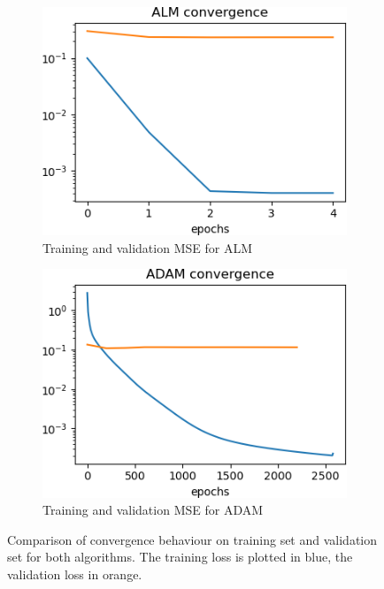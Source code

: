\begin{figure}[p]
     \centering
     \begin{subfigure}[b]{0.49\textwidth}
         \centering
         \includegraphics[width=\textwidth]{almlaserconv}
         \caption{Training and validation MSE for ALM}
         \label{almlaserconv}
     \end{subfigure}
     \begin{subfigure}[b]{0.49\textwidth}
         \centering
         \includegraphics[width=\textwidth]{adamlaserconv}
         \caption{Training and validation MSE for ADAM}
         \label{adamlaserconv}
     \end{subfigure}
     \caption{Comparison of convergence behaviour on training set and validation set for both algorithms. The training loss is plotted in blue, the validation loss in orange.}
     \label{laserconv}
\end{figure}

